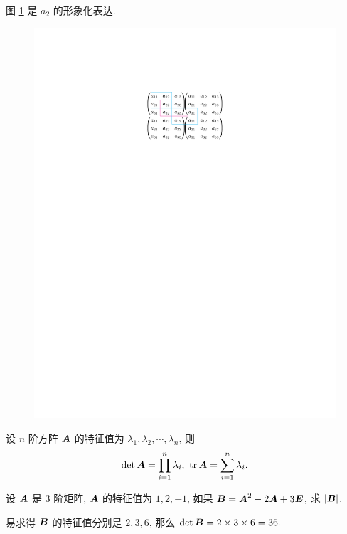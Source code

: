 图 \ref{fig:kjiezzshi} 是 $a_2$ 的形象化表达.
\begin{figure}[H]
    \centering
    \includegraphics[scale=1]{figures/kjiezzshi.pdf}
    \caption{}
    \label{fig:kjiezzshi}
\end{figure}

\begin{theorem}[特征值的积与和]
    设 $n$ 阶方阵 $\vb*{A}$ 的特征值为 $\lambda_1,\lambda_2,\cdots,\lambda_n$, 则 $$\det\vb*{A}=\prod_{i=1}^{n}\lambda_i,~\tr\vb*{A}=\sum_{i=1}^{n}\lambda_i.$$
\end{theorem}

\begin{example}
    设 $\vb*{A}$ 是 3 阶矩阵, $\vb*{A}$ 的特征值为 $1,2,-1$, 如果 $\vb*{B}=\vb*{A}^2-2\vb*{A}+3\vb*{E}$, 求 $|\vb*{B}|$.
\end{example}
\begin{solution}
    易求得 $\vb*{B}$ 的特征值分别是 $2,3,6$, 那么 $\det\vb*{B}=2\times3\times6=36.$
\end{solution}

